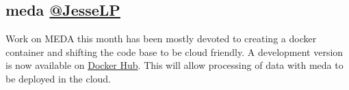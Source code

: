 \documentclass[simplex.tex]{subfiles}
\begin{document}
\subsection[meda]{meda \href{https://github.com/mrae}{@JesseLP}}


Work on MEDA this month has been mostly devoted to creating a docker
container and shifting the code base to be cloud friendly. 
A development version is  now available on
\href{https://hub.docker.com/r/neurodata/meda/}{Docker Hub}.  
This will allow processing of data with meda to be deployed in the cloud.  







\clearpage
\end{document}
